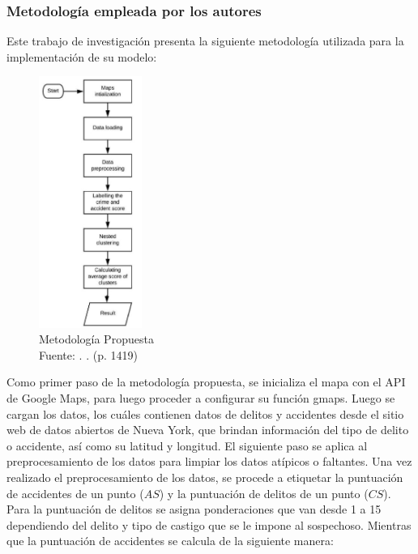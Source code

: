 \subsubsection{Metodología empleada por los autores}
Este trabajo de investigación presenta la siguiente metodología utilizada para la implementación de su modelo:

\begin{figure}[h]
	\begin{center}
		\includegraphics[width=0.30\textwidth]{2/figures/routeMet.jpg}
		\caption{Metodología Propuesta \\
			Fuente: \citep*{pr_Soni}. . (p. 1419)}
		\label{1:fig2}
	\end{center}
\end{figure}
Como primer paso de la metodología propuesta, se inicializa el mapa con el API de Google Maps, para luego proceder a configurar su función gmaps. Luego se cargan los datos, los cuáles contienen datos de delitos y accidentes desde el sitio web de datos abiertos de Nueva York, que brindan información del tipo de delito o accidente, así como su latitud y longitud. El siguiente paso se aplica al preprocesamiento de los datos para limpiar los datos atípicos o faltantes.
Una vez realizado el preprocesamiento de los datos, se procede a etiquetar la puntuación de accidentes de un punto ($AS$) y la puntuación de delitos de un punto ($CS$). Para la puntuación de delitos se asigna ponderaciones que van desde 1 a 15 dependiendo del delito y tipo de castigo que se le impone al sospechoso. Mientras que la puntuación de accidentes se calcula de la siguiente manera:

